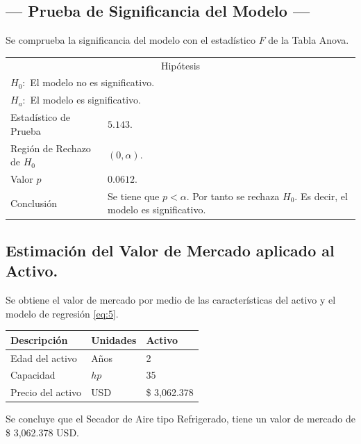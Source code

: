 \subsection{\centering --- Prueba de Significancia del Modelo ---} %
Se comprueba la significancia del modelo con el estadístico \(F\) de la Tabla Anova.
\begin{center}
  \begin{tabular}{|l|p{6cm}|}
    \cline{1-2}
    \multicolumn{2}{|c|}{Hipótesis}\\ \cline{1-2}
    \multicolumn{2}{|l|}{\(H_0:\) El modelo no es significativo.} \\ 
    \multicolumn{2}{|l|}{\(H_a:\) El modelo es significativo.} \\ \cline{1-2}
    Estadístico de Prueba & \(5.143\).\\ \cline{1-2} 
		Región de Rechazo de \(H_0\) & \((0, \alpha )\).\\ \cline{1-2} 
    Valor \(p\) & \(0.0612\).\\ \cline{1-2} 
    Conclusión & Se tiene que \(p<\alpha\). \newline 
		Por tanto se rechaza \(H_0\). \newline 
		Es decir, el modelo es significativo.\\ \cline{1-2} 
  \end{tabular}
\end{center} 

\subsection{\centering Estimación del Valor de Mercado aplicado al Activo.} %
Se obtiene el valor de mercado por medio de las características del activo y el modelo de regresión \eqref{eq:5}.
\begin{center}
  \begin{tabular}{|l|l|l|}
    \hline 
		Descripción   & Unidades  & Activo \\ \hline 
    Edad del activo    & Años      & 2      \\ \hline 
		Capacidad  & \(hp\) & 35   \\ \hline 
		Precio del activo   & USD       & \$ 3,062.378  \\ \hline 
  \end{tabular}
\end{center} 
Se concluye que el Secador de Aire tipo Refrigerado, tiene un valor de mercado de 
\$ 3,062.378  USD.

